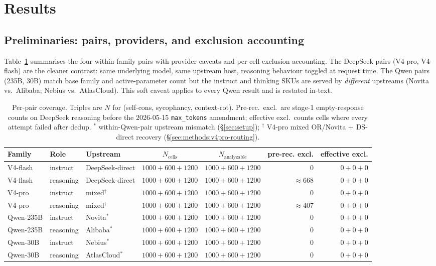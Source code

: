 \section{Results}
\label{sec:results}

\subsection{Preliminaries: pairs, providers, and exclusion accounting}
\label{sec:results:preliminaries}

Table~\ref{tab:pairs} summarises the four within-family pairs with
provider caveats and per-cell exclusion accounting. The DeepSeek pairs
(V4-pro, V4-flash) are the cleaner contrast: same underlying model, same
upstream host, reasoning behaviour toggled at request time. The Qwen
pairs (235B, 30B) match base family and active-parameter count but the
instruct and thinking SKUs are served by \emph{different} upstreams
(Novita vs.\ Alibaba; Nebius vs.\ AtlasCloud). This soft caveat applies
to every Qwen result and is restated in-text.

\begin{table}[!htbp]
\centering\scriptsize
\caption{Per-pair coverage. Triples are $N$ for (self-cons, sycophancy,
context-rot). Pre-rec.\ excl.\ are stage-1 empty-response counts on
DeepSeek reasoning before the 2026-05-15 \texttt{max\_tokens} amendment;
effective excl.\ counts cells where every attempt failed after dedup.
$^*$ within-Qwen-pair upstream mismatch (\S\ref{sec:setup});
$^\dagger$ V4-pro mixed OR/Novita + DS-direct recovery
(\S\ref{sec:methods:v4pro-routing}).}
\label{tab:pairs}
{\small\setlength{\tabcolsep}{4pt}
\begin{tabular}{@{}lllccrr@{}}
\toprule
Family & Role & Upstream & $N_{\mathrm{cells}}$ & $N_{\mathrm{analyzable}}$ & pre-rec. excl. & effective excl. \\
\midrule
V4-flash  & instruct  & DeepSeek-direct  & $1000{+}600{+}1200$ & $1000{+}600{+}1200$ & $0$               & $0{+}0{+}0$ \\
V4-flash  & reasoning & DeepSeek-direct  & $1000{+}600{+}1200$ & $1000{+}600{+}1200$ & ${\approx}668$    & $0{+}0{+}0$ \\
V4-pro    & instruct  & mixed$^\dagger$  & $1000{+}600{+}1200$ & $1000{+}600{+}1200$ & $0$               & $0{+}0{+}0$ \\
V4-pro    & reasoning & mixed$^\dagger$  & $1000{+}600{+}1200$ & $1000{+}600{+}1200$ & ${\approx}407$    & $0{+}0{+}0$ \\
Qwen-235B & instruct  & Novita$^*$       & $1000{+}600{+}1200$ & $1000{+}600{+}1200$ & $0$               & $0{+}0{+}0$ \\
Qwen-235B & reasoning & Alibaba$^*$      & $1000{+}600{+}1200$ & $1000{+}600{+}1200$ & $0$               & $0{+}0{+}0$ \\
Qwen-30B  & instruct  & Nebius$^*$       & $1000{+}600{+}1200$ & $1000{+}600{+}1200$ & $0$               & $0{+}0{+}0$ \\
Qwen-30B  & reasoning & AtlasCloud$^*$   & $1000{+}600{+}1200$ & $1000{+}600{+}1200$ & $0$               & $0{+}0{+}0$ \\
\bottomrule
\end{tabular}}
\end{table}

